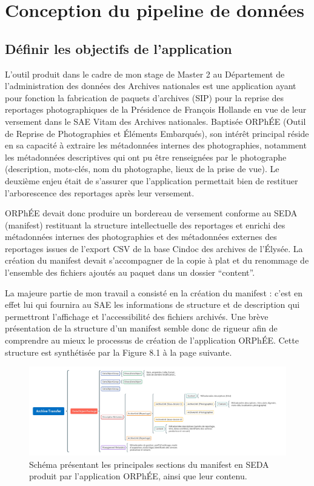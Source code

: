 \chapter{Conception du pipeline de données}
\section{Définir les objectifs de l'application}

L'outil produit dans le cadre de mon stage de Master 2 au Département de l'administration des données des Archives nationales est une application ayant pour fonction la fabrication de paquets d’archives (SIP) pour la reprise des reportages photographiques de la Présidence de François Hollande en vue de leur versement dans le SAE Vitam des Archives nationales. Baptisée ORPhÉE (Outil de Reprise de Photographies et Éléments Embarqués), son intérêt principal réside en sa capacité à extraire les métadonnées internes des photographies, notamment les métadonnées descriptives qui ont pu être renseignées par le photographe (description, mots-clés, nom du photographe, lieux de la prise de vue). Le deuxième enjeu était de s'assurer que l'application permettait bien de restituer l'arborescence des reportages après leur versement. 

ORPhÉE devait donc produire un bordereau de versement conforme au SEDA (manifest) restituant la structure intellectuelle des reportages et enrichi des métadonnées internes des photographies et des métadonnées externes des reportages issues de l'export CSV de la base Cindoc des archives de l'Élysée. La création du manifest devait s'accompagner de la copie à plat et du renommage de l'ensemble des fichiers ajoutés au paquet dans un dossier \enquote{content}. 

La majeure partie de mon travail a consisté en la création du manifest : c'est en effet lui qui fournira au SAE les informations de structure et de description qui permettront l'affichage et l'accessibilité des fichiers archivés. Une brève présentation de la structure d'un manifest semble donc de rigueur afin de comprendre au mieux le processus de création de l'application ORPhÉE. Cette structure est synthétisée par la Figure 8.1 à la page suivante.

\begin{figure}
	\centering
	\includegraphics[angle=90, height=\dimexpr\textheight-2cm\relax]{./img/ArchiveTransfer.jpg}
	\caption{Schéma présentant les principales sections du manifest en SEDA produit par l'application ORPhÉE, ainsi que leur contenu.}
\end{figure}

